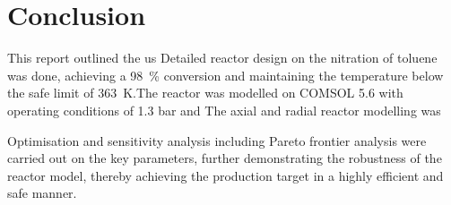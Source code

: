 \section{Conclusion} \label{sec:conclusion}
This report outlined the us
Detailed reactor design on the nitration of toluene was done, achieving a \SI{98}{\%} conversion and maintaining the temperature below the safe limit of \SI{363}{\K}.The reactor was modelled on COMSOL 5.6 with operating conditions of 1.3 bar and 
The axial and radial reactor modelling was 

Optimisation and sensitivity analysis including Pareto frontier analysis were carried out on the key parameters, further demonstrating the robustness of the reactor model, thereby achieving the production target in a highly efficient and safe manner.  
